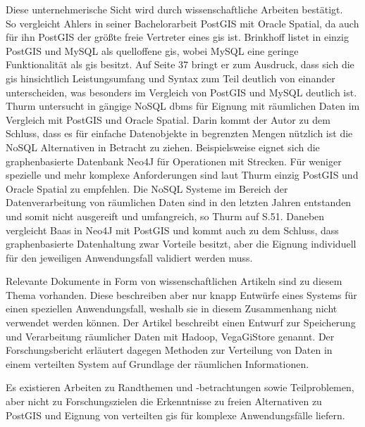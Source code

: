 Diese unternehmerische Sicht wird durch wissenschaftliche Arbeiten bestätigt.\\
So vergleicht Ahlers in seiner Bachelorarbeit \cite{ba:pgvsoracle} PostGIS mit Oracle Spatial, da auch für ihn PostGIS der größte freie Vertreter eines \Gls{gis} ist.
Brinkhoff listet in \cite[S.36]{book:prawirtinf} einzig PostGIS und MySQL als quelloffene \Gls{gis}, wobei MySQL eine geringe Funktionalität als \Gls{gis} besitzt.
Auf Seite 37 bringt er zum Ausdruck, dass sich die \Gls{gis} hinsichtlich Leistungsumfang und Syntax zum Teil deutlich von einander unterscheiden, was besonders im Vergleich von PostGIS und MySQL deutlich ist.
Thurm untersucht in \cite{ba:nosqlfuergeodaten} gängige NoSQL \Gls{dbms} für Eignung mit räumlichen Daten im Vergleich mit PostGIS und Oracle Spatial.
Darin kommt der Autor zu dem Schluss, dass es für einfache Datenobjekte in begrenzten Mengen nützlich ist die NoSQL Alternativen in Betracht zu ziehen.
Beispielsweise eignet sich die graphenbasierte Datenbank Neo4J für Operationen mit Strecken.
Für weniger spezielle und mehr komplexe Anforderungen sind laut Thurm einzig PostGIS und Oracle Spatial zu empfehlen.
Die NoSQL Systeme im Bereich der Datenverarbeitung von räumlichen Daten sind in den letzten Jahren entstanden und somit nicht ausgereift und umfangreich, so Thurm auf S.51.
Daneben vergleicht Baas in \cite{ma:neo4j} Neo4J mit PostGIS und kommt auch zu dem Schluss, dass graphenbasierte Datenhaltung zwar Vorteile besitzt, aber die Eignung individuell für den jeweiligen Anwendungsfall validiert werden muss.

Relevante Dokumente in Form von wissenschaftlichen Artikeln sind zu diesem Thema vorhanden.
Diese beschreiben aber nur knapp Entwürfe eines Systems für einen speziellen Anwendungsfall, weshalb sie in diesem Zusammenhang nicht verwendet werden können.
Der Artikel \cite{paper:hdfsspatial} beschreibt einen Entwurf zur Speicherung und Verarbeitung räumlicher Daten mit Hadoop, VegaGiStore genannt.
Der Forschungsbericht \cite{paper:spatialdistribution} erläutert dagegen Methoden zur Verteilung von Daten in einem verteilten System auf Grundlage der räumlichen Informationen.

Es existieren Arbeiten zu Randthemen und -betrachtungen sowie Teilproblemen, aber nicht zu Forschungszielen die Erkenntnisse zu freien Alternativen zu PostGIS und Eignung von verteilten \Gls{gis} für komplexe Anwendungsfälle liefern.


